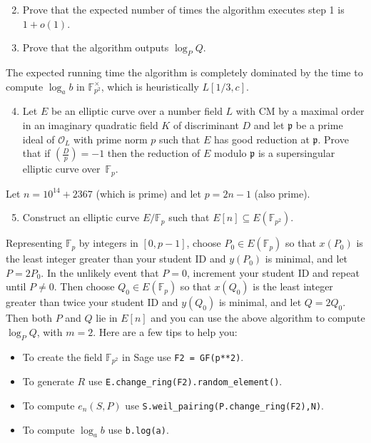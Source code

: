 \documentclass[11pt]{article}
\newcommand{\Fp}{\mathbb{F}_p}
\newcommand{\Fptwo}{\mathbb{F}_{p^2}}
\newcommand{\F}{\mathbb{F}}
\renewcommand{\O}{\mathcal{O}}
\newcommand{\p}{\mathfrak{p}}
\theoremstyle{definition}
\begin{document}
\begin{enumerate}[{\bf(a)}]
\setcounter{enumi}{1}
\item Prove that the expected number of times the algorithm executes step 1 is $1+o(1)$.
\item Prove that the algorithm outputs $\log_P Q$.
\end{enumerate}

The expected running time the algorithm is completely dominated by the time to compute $\log_a b $ in $\Fptwo^\times$, which is heuristically $L[1/3,c]$.
\medskip

\begin{enumerate}[{\bf(a)}]
\setcounter{enumi}{3}
\item Let $E$ be an elliptic curve over a number field $L$ with CM by a maximal order in an imaginary quadratic field $K$ of discriminant $D$  and let $\p$ be a prime ideal of $\O_L$ with prime norm $p$ such that $E$ has good reduction at $\p$.  Prove that if $\left(\frac{D}{p}\right)=-1$ then the reduction of $E$ modulo $\p$ is a supersingular elliptic curve over~$\Fp$.
\end{enumerate}

\noindent
Let $n=10^{14}+2367$ (which is prime) and let $p=2n-1$ (also prime).

\begin{enumerate}[{\bf(a)}]
\setcounter{enumi}{4}
\item Construct an elliptic curve $E/\Fp$ such that $E[n]\subseteq E(\Fptwo)$.
\end{enumerate}

Representing $\Fp$ by integers in $[0,p-1]$, choose $P_0\in E(\Fp)$ so that $x(P_0)$ is the least integer greater than your student ID and $y(P_0)$ is minimal, and let $P=2P_0$.
In the unlikely event that $P=0$, increment your student ID and repeat until $P\ne 0$.
Then choose $Q_0\in E(\Fp)$ so that $x(Q_0)$ is the least integer greater than twice your student ID and $y(Q_0)$ is minimal, and let $Q=2Q_0$.
Then both $P$ and $Q$ lie in $E[n]$ and you can use the above algorithm to compute $\log_P Q$, with $m=2$.
Here are a few tips to help you:

\begin{itemize}
\item To create the field $\F_{p^2}$ in Sage use \texttt{F2 = GF(p**2)}.
\item To generate $R$ use \texttt{E.change\_ring(F2).random\_element()}.
\item To compute $e_n(S,P)$ use \texttt{S.weil\_pairing(P.change\_ring(F2),N)}.
\item To compute $\log_a b$ use \texttt{b.log(a)}.
\end{itemize}
\end{document}

